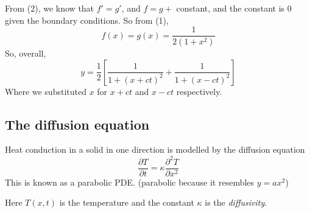 \documentclass[a4paper]{article}
\begin{document}
    From (2), we know that $f' = g'$, and $f = g + $ constant, and the constant is $0$ given the boundary conditions. So from (1),
    \[
      f(x) = g(x) = \frac{1}{2(1 + x^2)}
    \]
    So, overall,
    \[
      y = \frac{1}{2}\left[\frac{1}{1 + (x + ct)^2} + \frac{1}{1 + (x - ct)^2}\right]
    \]
    Where we substituted $x$ for $x +ct$ and $x - ct$ respectively.

    \subsection{The diffusion equation}
    Heat conduction in a solid in one direction is modelled by the diffusion equation
    \[
      \frac{\partial T}{\partial t} = \kappa \frac{\partial^2 T}{\partial x^2}
    \]
    This is known as a parabolic PDE. (parabolic because it resembles $y = ax^2$)

    Here $T(x, t)$ is the temperature and the constant $\kappa$ is the \emph{diffusivity}.
\end{document}
